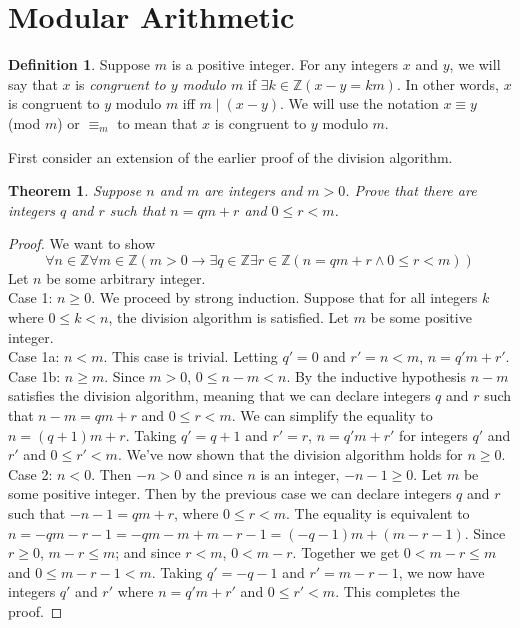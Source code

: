 \documentclass{report}
\newtheorem*{theorem}{Theorem}
\theoremstyle{definition}
\newtheorem*{definition}{Definition}
\begin{document}
\section{Modular Arithmetic}
\begin{definition}
Suppose $m$ is a positive integer. For any integers $x$ and $y$, we will say that $x$ is \textit{congruent to $y$ modulo $m$} if $\exists k\in\mathbb Z(x-y=km)$. In other words,
$x$ is congruent to $y$ modulo $m$ iff $m\mid(x-y)$. We will use the notation $x\equiv y$ (mod $m$) or $\equiv_m$ to mean that $x$ is congruent to $y$ modulo $m$.
\end{definition}
\noindent First consider an extension of the earlier proof of the division algorithm.
\begin{theorem}
Suppose $n$ and $m$ are integers and $m>0$. Prove that there are integers $q$ and $r$ such that $n=qm+r$ and $0\leq r<m$.
\end{theorem}
\begin{proof}
We want to show
\begin{equation*}
\forall n\in\mathbb Z\forall m\in\mathbb Z(m>0\to\exists q\in\mathbb Z\exists r\in\mathbb Z(n=qm+r\land0\leq r<m))
\end{equation*}
\indent Let $n$ be some arbitrary integer.\\
\indent Case 1: $n\geq0$. We proceed by strong induction. Suppose that for all integers $k$ where $0\leq k<n$, the division algorithm is satisfied. Let $m$ be some positive integer.\\
\indent Case 1a: $n<m$. This case is trivial. Letting $q'=0$ and $r'=n<m$, $n=q'm+r'$.\\
\indent Case 1b: $n\geq m$. Since $m>0$, $0\leq n-m<n$. By the inductive hypothesis $n-m$ satisfies the division algorithm, meaning that we can declare integers $q$ and $r$ such that 
$n-m=qm+r$ and $0\leq r<m$. We can simplify the equality to $n=(q+1)m+r$. Taking $q'=q+1$ and $r'=r$, $n=q'm+r'$ for integers $q'$ and $r'$ and $0\leq r'<m$. We've now shown that the division
algorithm holds for $n\geq0$.\\
\indent Case 2: $n<0$. Then $-n>0$ and since $n$ is an integer, $-n-1\geq0$. Let $m$ be some positive integer. Then by the previous case we can declare integers $q$ and $r$ such that $-n-1=qm+r$, 
where $0\leq r<m$. The equality is equivalent to $n=-qm-r-1=-qm-m+m-r-1=(-q-1)m+(m-r-1)$. 
Since $r\geq0$, $m-r\leq m$; and since $r<m$, $0<m-r$. Together we get $0<m-r\leq m$ and $0\leq m-r-1<m$. Taking $q'=-q-1$ and $r'=m-r-1$, we now have integers $q'$ and $r'$ where $n=q'm+r'$ and 
$0\leq r'<m$. This completes the proof.
\end{proof}
\end{document}
